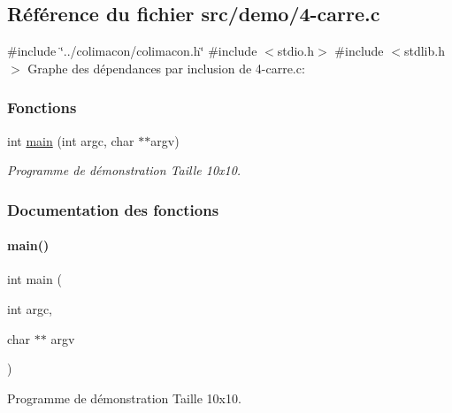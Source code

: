 \hypertarget{4-carre_8c}{}\subsection{Référence du fichier src/demo/4-\/carre.c}
\label{4-carre_8c}
{\ttfamily \#include \char`\"{}../colimacon/colimacon.\+h\char`\"{}}\newline
{\ttfamily \#include $<$stdio.\+h$>$}\newline
{\ttfamily \#include $<$stdlib.\+h$>$}\newline
Graphe des dépendances par inclusion de 4-\/carre.c\+:
\subsubsection*{Fonctions}
\begin{DoxyCompactItemize}
\item 
int \hyperlink{4-carre_8c_a3c04138a5bfe5d72780bb7e82a18e627}{main} (int argc, char $\ast$$\ast$argv)
\begin{DoxyCompactList}\small\item\em Programme de démonstration Taille 10x10. \end{DoxyCompactList}\end{DoxyCompactItemize}


\subsubsection{Documentation des fonctions}
\mbox{\label{4-carre_8c_a3c04138a5bfe5d72780bb7e82a18e627}} 
\paragraph{\texorpdfstring{main()}{main()}}
{\footnotesize\ttfamily int main (\begin{DoxyParamCaption}\item[{int}]{argc,  }\item[{char $\ast$$\ast$}]{argv }\end{DoxyParamCaption})}



Programme de démonstration Taille 10x10. 

